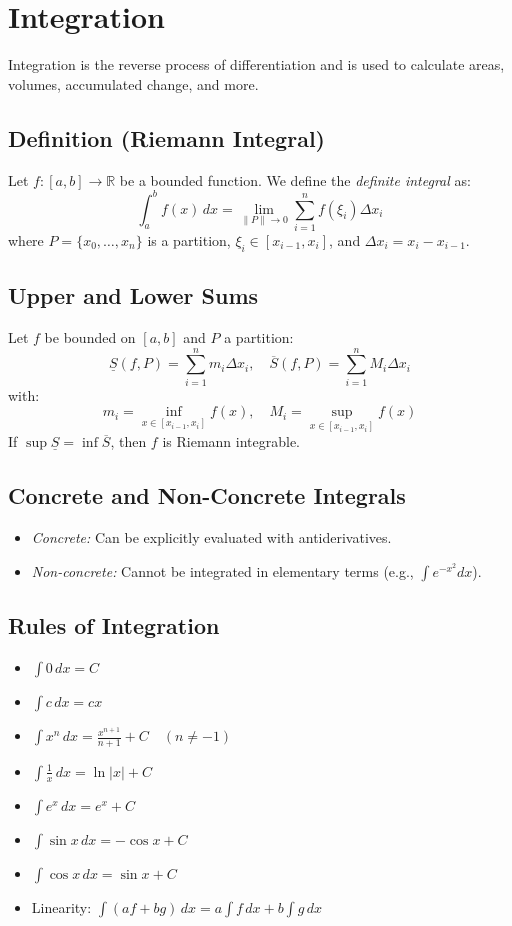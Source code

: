 \section{Integration}

Integration is the reverse process of differentiation and is used to calculate areas, volumes, accumulated change, and more.

\subsection{Definition (Riemann Integral)}

Let \(f: [a, b] \to \mathbb{R}\) be a bounded function. We define the \emph{definite integral} as:
\[
\int_a^b f(x)\,dx = \lim_{\|P\| \to 0} \sum_{i=1}^n f(\xi_i)\Delta x_i
\]
where \(P = \{x_0, \dots, x_n\}\) is a partition, \(\xi_i \in [x_{i-1}, x_i]\), and \(\Delta x_i = x_i - x_{i-1}\).

\subsection{Upper and Lower Sums}

Let \(f\) be bounded on \([a, b]\) and \(P\) a partition:
\[
\underline{S}(f, P) = \sum_{i=1}^n m_i \Delta x_i, \quad
\overline{S}(f, P) = \sum_{i=1}^n M_i \Delta x_i
\]
with:
\[
m_i = \inf_{x \in [x_{i-1}, x_i]} f(x), \quad
M_i = \sup_{x \in [x_{i-1}, x_i]} f(x)
\]
If \(\sup \underline{S} = \inf \overline{S}\), then \(f\) is Riemann integrable.

\subsection{Concrete and Non-Concrete Integrals}

\begin{itemize}[label=\(-\)]
\item \emph{Concrete:} Can be explicitly evaluated with antiderivatives.
\item \emph{Non-concrete:} Cannot be integrated in elementary terms (e.g., \(\int e^{-x^2} dx\)).
\end{itemize}

\subsection{Rules of Integration}

\begin{itemize}[label=\(-\)]
\item \(\int 0\,dx = C\)
\item \(\int c\,dx = cx\)
\item \(\int x^n\,dx = \frac{x^{n+1}}{n+1} + C \quad (n \ne -1)\)
\item \(\int \frac{1}{x}\,dx = \ln|x| + C\)
\item \(\int e^x\,dx = e^x + C\)
\item \(\int \sin x\,dx = -\cos x + C\)
\item \(\int \cos x\,dx = \sin x + C\)
\item Linearity: \(\int (af + bg)\,dx = a\int f\,dx + b\int g\,dx\)
\end{itemize}

